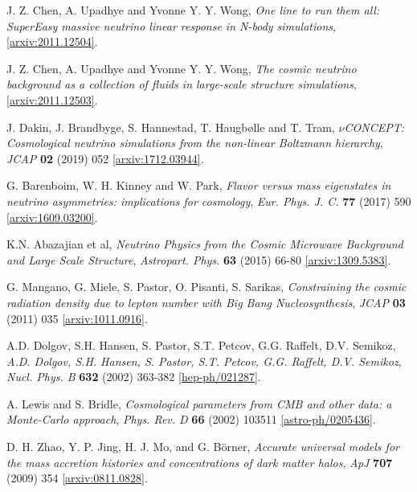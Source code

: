 \documentclass[a4paper,11pt]{article}
\begin{document}
\begin{thebibliography}{99}
J. Z. Chen, A. Upadhye and Yvonne Y. Y. Wong, \emph{One line to run them all: SuperEasy massive neutrino linear response in
N-body simulations}, \href{https://arxiv.org/abs/2011.12504}{[arxiv:2011.12504]}.

J. Z. Chen, A. Upadhye and Yvonne Y. Y. Wong, \emph{The cosmic neutrino background as a collection of fluids in large-scale structure simulations}, 
\href{https://arxiv.org/abs/2011.12503}{[arxiv:2011.12503]}.

 J. Dakin, J. Brandbyge, S. Hannestad, T. Haugbølle and T. Tram,  \emph{$\nu$CONCEPT: Cosmological neutrino simulations from the non-linear Boltzmann hierarchy}, \emph{JCAP} {\bf02} (2019) 052
\href{https://arxiv.org/abs/1712.03944}{[arxiv:1712.03944]}.

 G. Barenboim, W. H. Kinney and W. Park, \emph{ Flavor versus mass eigenstates in neutrino asymmetries: implications for cosmology}, \emph{Eur. Phys. J. C.} {\bf 77} (2017) 590
\href{https://arxiv.org/abs/1609.03200}{ [arxiv:1609.03200]}.


 K.N. Abazajian et al, \emph{Neutrino Physics from the Cosmic Microwave Background and Large Scale Structure}, \emph{Astropart. Phys.} {\bf63} (2015) 66-80 \href{https://arxiv.org/abs/1309.5383}{ [arxiv:1309.5383]}.

 G. Mangano, G. Miele, S. Pastor, O. Pisanti, S. Sarikas, \emph{Constraining the cosmic radiation density due to lepton number with Big Bang Nucleosynthesis}, \emph{JCAP} {\bf03} (2011) 035 \href{https://arxiv.org/abs/1011.0916v3}{[arxiv:1011.0916]}.

 A.D. Dolgov, S.H. Hansen, S. Pastor, S.T. Petcov, G.G. Raffelt, D.V. Semikoz, \emph{A.D. Dolgov, S.H. Hansen, S. Pastor, S.T. Petcov, G.G. Raffelt, D.V. Semikoz}, \emph{Nucl. Phys. B} {\bf632} (2002) 363-382 \href{https://arxiv.org/abs/hep-ph/0201287}{[hep-ph/021287]}.


 A. Lewis and S. Bridle, \emph{Cosmological parameters from CMB and other data: a Monte-Carlo
approach}, \emph{Phys. Rev. D} {\bf66} (2002) 103511 \href{https://arxiv.org/abs/astro-ph/0205436}{[astro-ph/0205436]}.


 D. H. Zhao, Y. P. Jing, H. J. Mo, and G. Börner, \emph{Accurate universal models for the mass accretion histories and concentrations of dark matter halos}, \emph{ApJ} {\bf707} (2009) 354 \href{https://arxiv.org/abs/0811.0828}{[arxiv:0811.0828]}.


\end{thebibliography}
\end{document}
